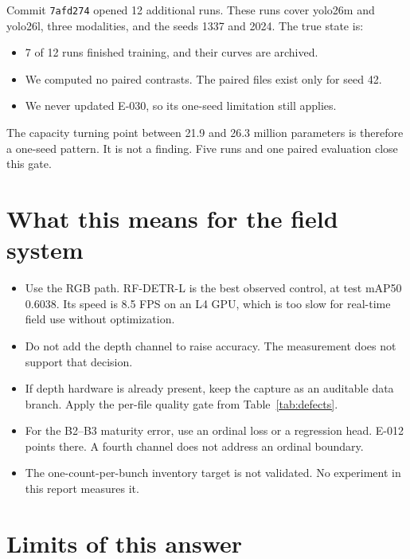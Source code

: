 \documentclass[preprint,12pt]{elsarticle}
\newcommand{\E}[1]{E-#1}
\newcommand{\mAP}{mAP}
\begin{document}
Commit \texttt{7afd274} opened 12 additional runs. These runs cover yolo26m and
yolo26l, three modalities, and the seeds 1337 and 2024. The true state is:

\begin{itemize}
\item 7 of 12 runs finished training, and their curves are archived.
\item We computed no paired contrasts. The paired files exist only for seed 42.
\item We never updated \E{030}, so its one-seed limitation still applies.
\end{itemize}

The capacity turning point between 21.9 and 26.3 million parameters is therefore
a one-seed pattern. It is not a finding. Five runs and one paired evaluation
close this gate.

\section{What this means for the field system}
\label{sec:consequence}

\begin{itemize}
\item Use the RGB path. RF-DETR-L is the best observed control, at test \mAP50
0.6038. Its speed is 8.5 FPS on an L4 GPU, which is too slow for real-time field
use without optimization.
\item Do not add the depth channel to raise accuracy. The measurement does not
support that decision.
\item If depth hardware is already present, keep the capture as an auditable
data branch. Apply the per-file quality gate from Table~\ref{tab:defects}.
\item For the B2--B3 maturity error, use an ordinal loss or a regression head.
\E{012} points there. A fourth channel does not address an ordinal boundary.
\item The one-count-per-bunch inventory target is not validated. No experiment
in this report measures it.
\end{itemize}

\section{Limits of this answer}
\label{sec:limits}
\end{document}
